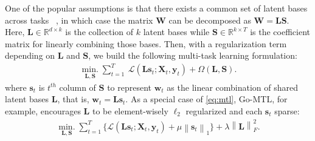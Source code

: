 \documentclass{article}
\newcommand{\vct}[1]{\boldsymbol{#1}} %
\newcommand{\mat}[1]{\boldsymbol{#1}} %
\newcommand{\norm}[1]{\left\|#1\right\|}
\begin{document}
	One of the popular assumptions is that there exists a common set of latent bases across tasks ~\cite{argyriou08,go-mtl}, in which case the matrix $\mat{W}$ can be decomposed as $\mat{W}=\mat{L}\mat{S}$. Here, $\mat{L} \in \mathbb{R}^{d \times k}$ is the collection of $k$ latent bases while $\mat{S} \in \mathbb{R}^{k \times T}$ is the coefficient matrix for linearly combining those bases. Then, with a regularization term depending on $\mat{L}$ and $\mat{S}$, we build the following multi-task learning formulation:
	\begin{equation}
	\begin{aligned}
	\operatorname*{min.}_{\mat{L},\mat{S}} \sum_{t=1}^T \ \mathcal{L}(\mat{L}\vct{s}_t; \mat{X}_t, \vct{y}_t) + \Omega(\mat{L},\mat{S}).\label{eq:mtl}
	\end{aligned}
	\end{equation}
	where $\vct{s}_t$ is $t^{th}$ column of $\mat{S}$ to represent $\vct{w}_t$ as the linear combination of shared latent bases $\mat{L}$, that is, $\vct{w}_t = \mat{L}\vct{s}_t$. As a special case of \eqref{eq:mtl}, Go-MTL\cite{go-mtl}, for example, encourages $\mat{L}$ to be element-wisely $\ell_2$ regularized and each $\vct{s}_t$ sparse:
	\begin{equation}
	\begin{aligned}
	\operatorname*{min.}_{\mat{L},\mat{S}} \sum_{t=1}^T \Big\{ \mathcal{L}(\mat{L}\vct{s}_t; \mat{X}_t, \vct{y}_t) + \mu \norm{\vct{s}_t}_1 \Big\} + \lambda \norm{\mat{L}}_F^2. \label{eq:go-mtl}
	\end{aligned}
	\end{equation}
	
\end{document}
